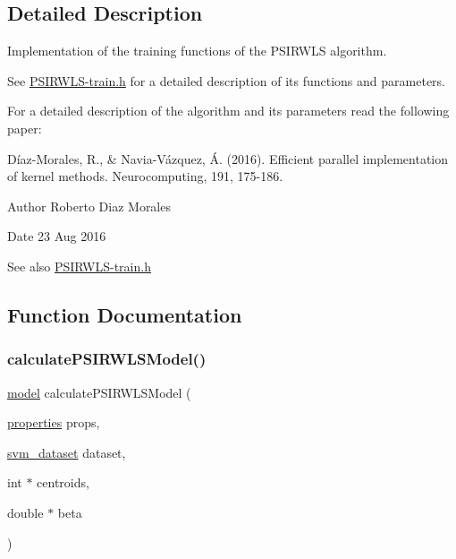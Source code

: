 \subsection{Detailed Description}
Implementation of the training functions of the P\+S\+I\+R\+W\+LS algorithm. 

See \hyperlink{PSIRWLS-train_8h}{P\+S\+I\+R\+W\+L\+S-\/train.\+h} for a detailed description of its functions and parameters.

For a detailed description of the algorithm and its parameters read the following paper\+:

Díaz-\/\+Morales, R., \& Navia-\/\+Vázquez, Á. (2016). Efficient parallel implementation of kernel methods. Neurocomputing, 191, 175-\/186.

\begin{DoxyAuthor}{Author}
Roberto Diaz Morales 
\end{DoxyAuthor}
\begin{DoxyDate}{Date}
23 Aug 2016 
\end{DoxyDate}
\begin{DoxySeeAlso}{See also}
\hyperlink{PSIRWLS-train_8h}{P\+S\+I\+R\+W\+L\+S-\/train.\+h} 
\end{DoxySeeAlso}


\subsection{Function Documentation}
\hypertarget{PSIRWLS-train_8c_a71b4329438bbf3210414315619f7b804}{}\label{PSIRWLS-train_8c_a71b4329438bbf3210414315619f7b804} 
\subsubsection{\texorpdfstring{calculate\+P\+S\+I\+R\+W\+L\+S\+Model()}{calculatePSIRWLSModel()}}
{\ttfamily \hyperlink{structmodel}{model} calculate\+P\+S\+I\+R\+W\+L\+S\+Model (\begin{DoxyParamCaption}\item[{\hyperlink{structproperties}{properties}}]{props,  }\item[{\hyperlink{structsvm__dataset}{svm\+\_\+dataset}}]{dataset,  }\item[{int $\ast$}]{centroids,  }\item[{double $\ast$}]{beta }\end{DoxyParamCaption})}



